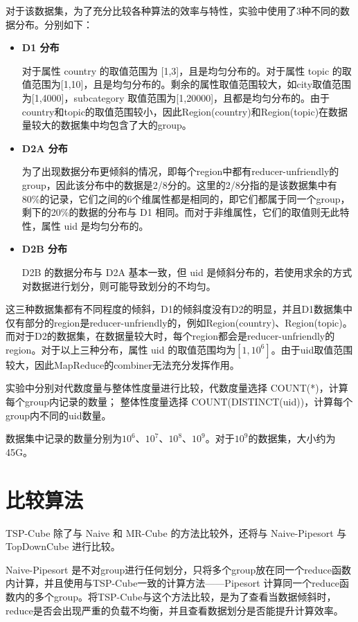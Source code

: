 对于该数据集，为了充分比较各种算法的效率与特性，实验中使用了3种不同的数据分布。分别如下：
\begin{itemize}

\item \textbf{D1 分布}

对于属性 country 的取值范围为 [1,3]，且是均匀分布的。对于属性 topic 的取值范围为[1,10]，且是均匀分布的。剩余的属性取值范围较大，如city取值范围为[1,4000]，subcategory 取值范围为[1,20000]，且都是均匀分布的。由于country和topic的取值范围较小，因此Region(country)和Region(topic)在数据量较大的数据集中均包含了大的group。

\item \textbf{D2A 分布}

为了出现数据分布更倾斜的情况，即每个region中都有reducer-unfriendly的group，因此该分布中的数据是2/8分的。这里的2/8分指的是该数据集中有80\%的记录，它们之间的6个维属性都是相同的，即它们都属于同一个group，剩下的20\%的数据的分布与 D1 相同。而对于非维属性，它们的取值则无此特性，属性 uid 是均匀分布的。

\item \textbf{D2B 分布}

D2B 的数据分布与 D2A 基本一致，但 uid 是倾斜分布的，若使用求余的方式对数据进行划分，则可能导致划分的不均匀。

\end{itemize}

这三种数据集都有不同程度的倾斜，D1的倾斜度没有D2的明显，并且D1数据集中仅有部分的region是reducer-unfriendly的，例如Region(country)、Region(topic)。而对于D2的数据集，在数据量较大时，每个region都会是reducer-unfriendly的region。对于以上三种分布，属性 uid 的取值范围均为$[1,{10}^{6}]$。由于uid取值范围较大，因此MapReduce的combiner无法充分发挥作用。

实验中分别对代数度量与整体性度量进行比较，代数度量选择 COUNT(*)，计算每个group内记录的数量； 整体性度量选择 COUNT(DISTINCT(uid))，计算每个group内不同的uid数量。

数据集中记录的数量分别为${10}^{6}$、${10}^{7}$、${10}^{8}$、${10}^{9}$。对于${10}^{9}$的数据集，大小约为45G。


\section{比较算法}

TSP-Cube 除了与 Naive 和 MR-Cube 的方法比较外，还将与 Naive-Pipesort 与 TopDownCube \cite{lee2012efficient} 进行比较。

Naive-Pipesort 是不对group进行任何划分，只将多个group放在同一个reduce函数内计算，并且使用与TSP-Cube一致的计算方法——Pipesort 计算同一个reduce函数内的多个group。将TSP-Cube与这个方法比较，是为了查看当数据倾斜时，reduce是否会出现严重的负载不均衡，并且查看数据划分是否能提升计算效率。


